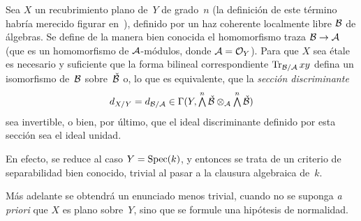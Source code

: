 \begin{proposition}
\label{I.4.10}
Sea $X$ un recubrimiento plano de~$Y$ de grado~$n$ (la definición de este término habría merecido figurar en~), definido por un haz coherente localmente libre $\cal{B}$ de álgebras. Se define de la manera bien conocida el homomorfismo traza $\cal{B}\to\cal{A}$ (que es un homomorfismo de $\cal{A}$-módulos, donde $\cal{A}=\cal{O}_Y$). Para que $X$ sea étale es necesario y suficiente que la forma bilineal correspondiente $\trace_{\cal{B}/\cal{A}}xy$ defina un isomorfismo de~$\cal{B}$ sobre~$\check{\cal{B}}$ o, lo que es equivalente, que la \emph{sección discriminante}
$$
d_{X/Y}=d_{\cal{B}/\cal{A}}\in
\Gamma(Y,\tbigwedge^n\check{\cal{B}}\otimes_{\cal{A}}
\tbigwedge^n\check{\cal{B}})
$$
sea invertible, o bien, por último, que el ideal discriminante definido por esta sección sea el ideal unidad.
\end{proposition}
En efecto, se reduce al caso $Y=\Spec(k)$, y entonces se trata de un criterio de separabilidad bien conocido, trivial al pasar a la clausura algebraica de~$k$.

\begin{remarquestar}
Más adelante se obtendrá un enunciado menos trivial, cuando no se suponga \emph{a priori} que $X$ es plano sobre~$Y$, sino que se formule una hipótesis de normalidad.
\end{remarquestar}

